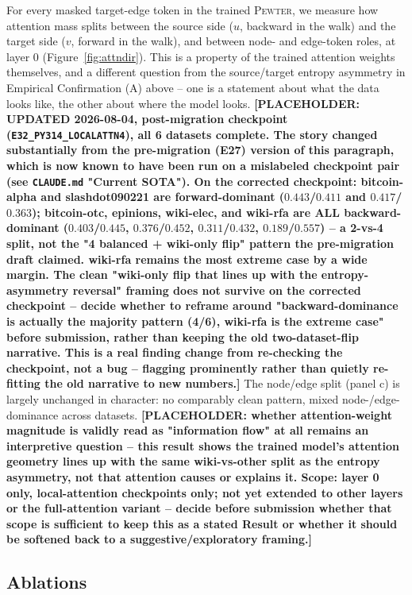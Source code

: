 \documentclass[letterpaper]{article} %
\newcommand{\method}{\textsc{Pewter}\xspace}
\newcommand{\ph}[1]{\textbf{[#1]}}  %
\theoremstyle{plain}
\theoremstyle{definition}
\begin{document}
For every masked target-edge token in the trained \method, we measure how attention mass splits between the source side ($u$, backward in the walk) and the target side ($v$, forward in the walk), and between node- and edge-token roles, at layer 0 (Figure~\ref{fig:attndir}). This is a property of the trained attention weights themselves, and a different question from the source/target entropy asymmetry in Empirical Confirmation (A) above -- one is a statement about what the data looks like, the other about where the model looks. \ph{PLACEHOLDER: UPDATED 2026-08-04, post-migration checkpoint (\texttt{E32\_PY314\_LOCALATTN4}), all 6 datasets complete. The story changed substantially from the pre-migration (E27) version of this paragraph, which is now known to have been run on a mislabeled checkpoint pair (see \texttt{CLAUDE.md} "Current SOTA"). On the corrected checkpoint: bitcoin-alpha and slashdot090221 are forward-dominant ($0.443$/$0.411$ and $0.417$/$0.363$); bitcoin-otc, epinions, wiki-elec, and wiki-rfa are ALL backward-dominant ($0.403$/$0.445$, $0.376$/$0.452$, $0.311$/$0.432$, $0.189$/$0.557$) -- a 2-vs-4 split, not the "4 balanced + wiki-only flip" pattern the pre-migration draft claimed. wiki-rfa remains the most extreme case by a wide margin. The clean "wiki-only flip that lines up with the entropy-asymmetry reversal" framing does not survive on the corrected checkpoint -- decide whether to reframe around "backward-dominance is actually the majority pattern (4/6), wiki-rfa is the extreme case" before submission, rather than keeping the old two-dataset-flip narrative. This is a real finding change from re-checking the checkpoint, not a bug -- flagging prominently rather than quietly re-fitting the old narrative to new numbers.} The node/edge split (panel c) is largely unchanged in character: no comparably clean pattern, mixed node-/edge-dominance across datasets. \ph{PLACEHOLDER: whether attention-weight magnitude is validly read as "information flow" at all remains an interpretive question -- this result shows the trained model's attention geometry lines up with the same wiki-vs-other split as the entropy asymmetry, not that attention causes or explains it. Scope: layer 0 only, local-attention checkpoints only; not yet extended to other layers or the full-attention variant -- decide before submission whether that scope is sufficient to keep this as a stated Result or whether it should be softened back to a suggestive/exploratory framing.}

\subsection{Ablations}
\end{document}
